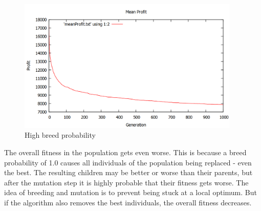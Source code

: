 \documentclass[fontsize=12pt,toc=bibliography, notitlepage]{scrreprt}
\begin{document}
\begin{figure}[H]
	\centering
	\includegraphics[width=400px]{images/breed-high.png}
	\caption{High breed probability}
	\label{fig:breed-high}
\end{figure}
The overall fitness in the population gets even worse. This is because a breed probability of 1.0 causes all individuals of the population being replaced - even the best. The resulting children may be better or worse than their parents, but after the mutation step it is highly probable that their fitness gets worse. The idea of breeding and mutation is to prevent being stuck at a local optimum. But if the algorithm also removes the best individuals, the overall fitness decreases.
\end{document}
